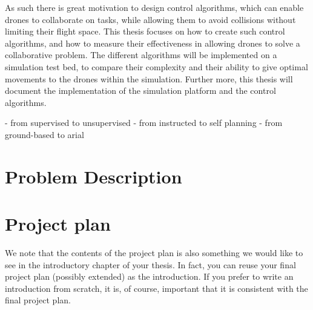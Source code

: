 As such there is great motivation to design control algorithms, which can enable drones to collaborate on tasks, while allowing them to avoid collisions without limiting their flight space. 
This thesis focuses on how to create such control algorithms, and how to measure their effectiveness in allowing drones to solve a collaborative problem. 
The different algorithms will be implemented on a simulation test bed, to compare their complexity and their ability to give optimal movements to the drones within the simulation. 
Further more, this thesis will document the implementation of the simulation platform and the control algorithms.


- from supervised to unsupervised
- from instructed to self planning
- from ground-based to arial
\section{Problem Description}




\section{Project plan}
We note that the contents of the project plan is also something we would like to see in the introductory chapter of your thesis. In fact, you can reuse your final project plan (possibly extended) as the introduction. If you prefer to write an introduction from scratch, it is, of course, important that it is consistent with the final project plan.



%
%

